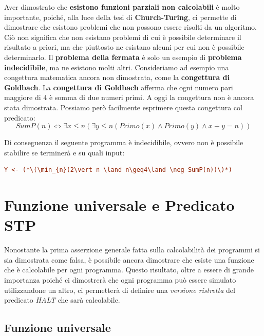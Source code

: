 Aver dimostrato che \textbf{esistono funzioni parziali non calcolabili} è molto importante, poiché, alla luce della tesi di \textbf{Church-Turing}, ci permette di dimostrare che esistono problemi che non possono essere risolti da un algoritmo.
Ciò non significa che non esistano problemi di cui è possibile determinare il risultato a priori, ma che piuttosto ne esistano alcuni per cui non è possibile determinarlo.
Il \textbf{problema della fermata} è solo un esempio di \textbf{problema indecidibile}, ma ne esistono molti altri. Consideriamo ad esempio una congettura matematica ancora non dimostrata, come la \textbf{congettura di Goldbach}.
La \textbf{congettura di Goldbach} afferma che ogni numero pari maggiore di \(4\) è somma di due numeri primi.
A oggi la congettura non è ancora stata dimostrata. Possiamo però facilmente esprimere questa congettura col predicato:
\begin{equation}
  SumP(n) \iff \exists x \leq n (\exists y \leq n ( Primo(x) \land Primo(y) \land x+y=n))
\end{equation}

Di conseguenza il seguente programma è indecidibile, ovvero non è possibile stabilire se terminerà e su quali input:
\begin{lstlisting}[language=ini, caption={ }, label={controesempio Goldbach}]
  Y <- (*\(\min_{n}(2\vert n \land n\geq4\land \neg SumP(n))\)*)
\end{lstlisting}


\section{Funzione universale e Predicato STP}

Nonostante la prima asserzione generale fatta sulla calcolabilità dei programmi si sia dimostrata come falsa, è possibile ancora dimostrare che esiste una funzione che è calcolabile per ogni programma.
Questo risultato, oltre a essere di grande importanza poiché ci dimostrerà che ogni programma può essere simulato utilizzandone un altro, ci permetterà di definire una \textit{versione ristretta} del predicato \textit{HALT} che sarà calcolabile.
\subsection{Funzione universale}


